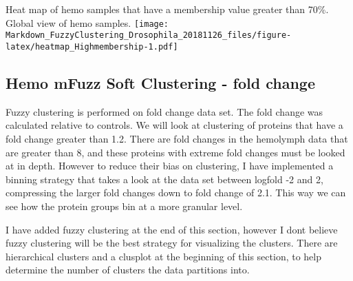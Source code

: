 \documentclass[]{article}
\begin{document}
Heat map of hemo samples that have a membership value greater than 70\%.
Global view of hemo samples.
\texttt{[image: Markdown\_FuzzyClustering\_Drosophila\_20181126\_files/figure-latex/heatmap\_Highmembership-1.pdf]}

\subsection{Hemo mFuzz Soft Clustering - fold
change}\label{hemo-mfuzz-soft-clustering---fold-change}

Fuzzy clustering is performed on fold change data set. The fold change
was calculated relative to controls. We will look at clustering of
proteins that have a fold change greater than 1.2. There are fold
changes in the hemolymph data that are greater than 8, and these
proteins with extreme fold changes must be looked at in depth. However
to reduce their bias on clustering, I have implemented a binning
strategy that takes a look at the data set between logfold -2 and 2,
compressing the larger fold changes down to fold change of 2.1. This way
we can see how the protein groups bin at a more granular level.

I have added fuzzy clustering at the end of this section, however I dont
believe fuzzy clustering will be the best strategy for visualizing the
clusters. There are hierarchical clusters and a clusplot at the
beginning of this section, to help determine the number of clusters the
data partitions into.
\end{document}
